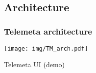\documentclass[final, hyperref, table]{beamer}
\begin{document}

\subsection{Architecture}
\begin{frame}\frametitle{Telemeta architecture}
  \begin{center}
    \texttt{[image: img/TM\_arch.pdf]}
  \end{center}
\end{frame}


\begin{frame}[plain]{Telemeta UI (demo)}
  \begin{center}
  \end{center}

\end{frame}
\end{document}
